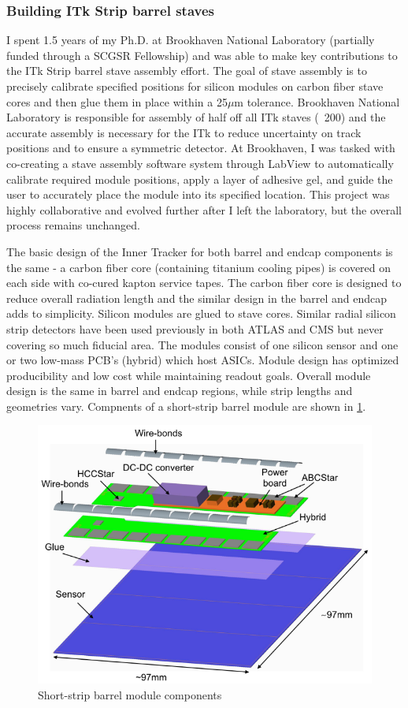 \subsubsection{Building ITk Strip barrel staves}
I spent 1.5 years of my Ph.D. at Brookhaven National Laboratory (partially funded through a SCGSR Fellowship) and was able to make key contributions to the ITk Strip barrel stave assembly effort. The goal of stave assembly is to precisely calibrate specified positions for silicon modules on carbon fiber stave cores and then glue them in place within a 25$\mu$m tolerance. Brookhaven National Laboratory is responsible for assembly of half off all ITk staves (~200) and the accurate assembly is necessary for the ITk to reduce uncertainty on track positions and to ensure a symmetric detector. At Brookhaven, I was tasked with co-creating a stave assembly software system through LabView to automatically calibrate required module positions, apply a layer of adhesive gel, and guide the user to accurately place the module into its specified location. This project was highly collaborative and evolved further after I left the laboratory, but the overall process remains unchanged.

The basic design of the Inner Tracker for both barrel and endcap components is the same - a carbon fiber core (containing titanium cooling pipes) is covered on each side with co-cured kapton service tapes. The carbon fiber core is designed to reduce overall radiation length and the similar design in the barrel and endcap adds to simplicity. Silicon modules are glued to stave cores. Similar radial silicon strip detectors have been used previously in both ATLAS and CMS but never covering so much fiducial area. The modules consist of one silicon sensor and one or two low-mass PCB's (hybrid) which host ASICs. Module design has optimized producibility and low cost while maintaining readout goals. Overall module design is the same in barrel and endcap regions, while strip lengths and geometries vary. Compnents of a short-strip barrel module are shown in \ref{fig:module}.
\begin{figure}[!h]
        \centering
    \includegraphics[width=.4\textwidth]{Pictures/ITkmodule.png}
    \caption{Short-strip barrel module components \cite{ITktech}}
    \label{fig:module}
\end{figure}
 
